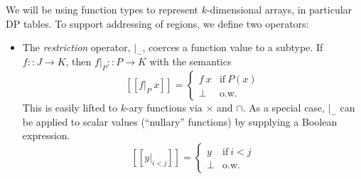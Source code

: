 \documentclass{article}
\newcommand\newterm[1]{{\it #1}}
\newcommand\semp[1]{[\![{#1}]\!]}
\begin{document}
We will be using function types to represent $k$-dimensional arrays, in particular DP tables.
To support addressing of regions, we define two operators:

\begin{itemize}
  \item The \newterm{restriction} operator, $\big|_-$, coerces a function value to a subtype. 
    If $f::J\to K$, then $f\big|_P :: P\to K$
    with the semantics 
    \[\semp{f\big|_P\ x} = \begin{cases}f\ x & \textrm{if}~P(x)\\ \bot & \textrm{o.w.}\end{cases}\]
    This is easily lifted to $k$-ary functions via $\times$ and $\cap$.
    As a special case, $\big|_-$ can be applied to scalar values (``nullary'' functions)
    by supplying a Boolean expression.
    \[\semp{y\big|_{i<j}} = \begin{cases}y & \textrm{if}~i<j \\ \bot & \textrm{o.w.}\end{cases}\]
\end{itemize}



\end{document}

